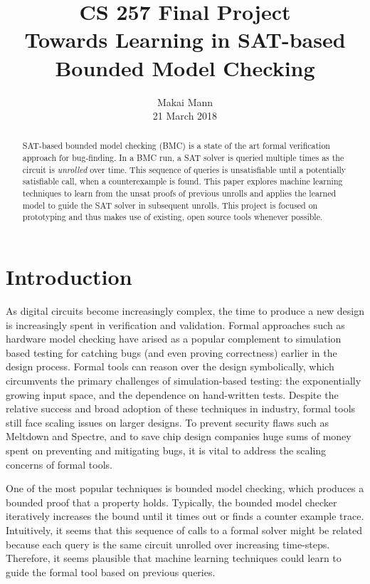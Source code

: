 \documentclass[letterpaper]{article} %
\begin{document}
%
\title{CS 257 Final Project \\ Towards Learning in SAT-based Bounded Model Checking}
\author{Makai Mann \\
21 March 2018
}
\maketitle
\begin{abstract}
SAT-based bounded model checking (BMC) is a state of the art formal verification approach for bug-finding. In a BMC run, a SAT solver is queried multiple times as the circuit is \textit{unrolled} over time. This sequence of queries is unsatisfiable until a potentially satisfiable call, when a counterexample is found. This paper explores machine learning techniques to learn from the unsat proofs of previous unrolls and applies the learned model to guide the SAT solver in subsequent unrolls. This project is focused on prototyping and thus makes use of existing, open source tools whenever possible.
\end{abstract}

\section{Introduction}
\noindent As digital circuits become increasingly complex, the time to produce a new design is increasingly spent in verification and validation. Formal approaches such as hardware model checking have arised as a popular complement to simulation based testing for catching bugs (and even proving correctness) earlier in the design process. Formal tools can reason over the design symbolically, which circumvents the primary challenges of simulation-based testing: the exponentially growing input space, and the dependence on hand-written tests. Despite the relative success and broad adoption of these techniques in industry, formal tools still face scaling issues on larger designs. To prevent security flaws such as Meltdown and Spectre, and to save chip design companies huge sums of money spent on preventing and mitigating bugs, it is vital to address the scaling concerns of formal tools.

One of the most popular techniques is bounded model checking, which produces a bounded proof that a property holds. Typically, the bounded model checker iteratively increases the bound until it times out or finds a counter example trace. Intuitively, it seems that this sequence of calls to a formal solver might be related because each query is the same circuit unrolled over increasing time-steps. Therefore, it seems plausible that machine learning techniques could learn to guide the formal tool based on previous queries.
\end{document}
